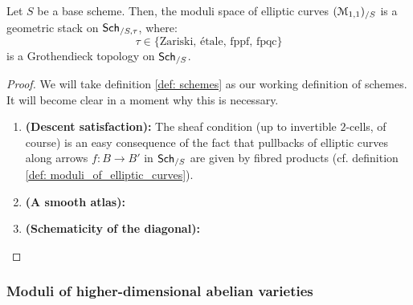                     \begin{proposition} \label{prop: moduli_stacks_of_elliptic_curves}
                        Let $S$ be a base scheme. Then, the moduli space of elliptic curves $(\mathcal{M}_{1, 1})_{/S}$ is a geometric stack on $\mathsf{Sch}_{/S, \tau}$, where:
                            $$\tau \in \{\text{Zariski, \'etale, fppf, fpqc}\}$$
                        is a Grothendieck topology on $\mathsf{Sch}_{/S}$.
                    \end{proposition}
                        \begin{proof}
                            We will take definition \ref{def: schemes} as our working definition of schemes. It will become clear in a moment why this is necessary.
                            \begin{enumerate}
                                \item \textbf{(Descent satisfaction):} The sheaf condition (up to invertible $2$-cells, of course) is an easy consequence of the fact that pullbacks of elliptic curves along arrows $f: B \to B'$ in $\mathsf{Sch}_{/S}$ are given by fibred products (cf. definition \ref{def: moduli_of_elliptic_curves}).
                                \item \textbf{(A smooth atlas):} 
                                \item \textbf{(Schematicity of the diagonal):} 
                            \end{enumerate}
                        \end{proof}
            
            \subsubsection{Moduli of higher-dimensional abelian varieties}